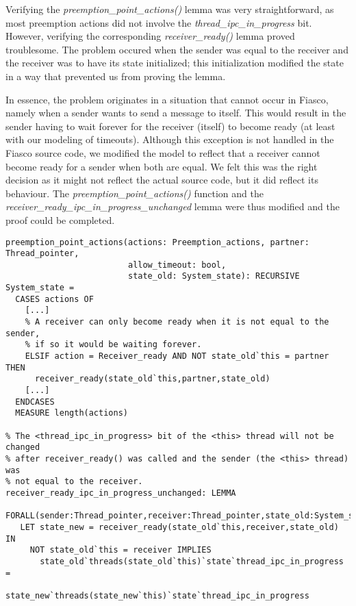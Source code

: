 Verifying the \emph{preemption\_point\_actions()} lemma was very straightforward, as most preemption actions did not involve the \emph{thread\_ipc\_in\_progress} bit. However, verifying the corresponding \emph{receiver\_ready()} lemma proved troublesome. The problem occured when the sender was equal to the receiver and the receiver was to have its state initialized; this initialization modified the state in a way that prevented us from proving the lemma.\emptyline

In essence, the problem originates in a situation that cannot occur in Fiasco, namely when a sender wants to send a message to itself. This would result in the sender having to wait forever for the receiver (itself) to become ready (at least with our modeling of timeouts). Although this exception is not handled in the Fiasco source code, we modified the model to reflect that a receiver cannot become ready for a sender when both are equal. We felt this was the right decision as it might not reflect the actual source code, but it did reflect its behaviour. The \emph{preemption\_point\_actions()} function and the \emph{receiver\_ready\_ipc\_in\_progress\_unchanged} lemma were thus modified and the proof could be completed.

\lstset{language=PVS}
\begin{lstlisting}[caption={PVS: \emph{receiver\_ready()}- and dependent \emph{preemption\_actions()} lemma.}]
% Execute a list of preemption point actions.
preemption_point_actions(actions: Preemption_actions, partner: Thread_pointer,
                         allow_timeout: bool, 
                         state_old: System_state): RECURSIVE System_state =
  CASES actions OF
    [...]
    % A receiver can only become ready when it is not equal to the sender,
    % if so it would be waiting forever.
    ELSIF action = Receiver_ready AND NOT state_old`this = partner THEN
      receiver_ready(state_old`this,partner,state_old)    
    [...]    
  ENDCASES
  MEASURE length(actions)

% The <thread_ipc_in_progress> bit of the <this> thread will not be changed 
% after receiver_ready() was called and the sender (the <this> thread) was 
% not equal to the receiver.
receiver_ready_ipc_in_progress_unchanged: LEMMA
 FORALL(sender:Thread_pointer,receiver:Thread_pointer,state_old:System_state):
   LET state_new = receiver_ready(state_old`this,receiver,state_old) IN
     NOT state_old`this = receiver IMPLIES
       state_old`threads(state_old`this)`state`thread_ipc_in_progress =
         state_new`threads(state_new`this)`state`thread_ipc_in_progress
\end{lstlisting}

